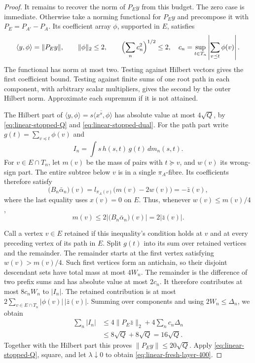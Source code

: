 \begin{proof}
It remains to recover the norm of \(P_Ey\) from this budget. The zero
case is immediate. Otherwise take a norming functional for \(P_Ey\)
and precompose it with \(P_E=P_{A'}-P_A\). Its coefficient array
\(\phi\), supported in \(E\), satisfies
\begin{equation}\label{eq:linear-stopped-dual}
 \langle y,\phi\rangle=\|P_Ey\|,\qquad
 \|\phi\|_2\le2,\qquad
 \Bigl(\sum_nc_n^2\Bigr)^{1/2}\le2,
 \quad c_n=\sup_{t\in T_n}\left|\sum_{v\preceq t}\phi(v)\right|.
\end{equation}
The functional has norm at most two. Testing against Hilbert vectors
gives the first coefficient bound. Testing against finite sums of one
root path in each component, with arbitrary scalar multipliers, gives
the second by the outer Hilbert norm. Approximate each supremum if it
is not attained.

The Hilbert part of
\(\langle y,\phi\rangle=\overline{s\langle x^s,\phi\rangle}\)
has absolute value at most \(4\sqrt Q\), by
\eqref{eq:linear-stopped-Q} and \eqref{eq:linear-stopped-dual}.
For the path part write \(g(t)=\sum_{v\preceq t}\phi(v)\) and
\[
 I_n=\int s\,h(s,t)\,g(t)\,dm_n(s,t).
\]
For \(v\in E\cap T_n\), let \(m(v)\) be the mass of pairs with
\(t\succeq v\), and \(w(v)\) its wrong-sign part. The entire subtree
below \(v\) is in a single \(\pi_A\)-fibre. Its coefficients therefore satisfy
\[
 \bigl(B_n\bar\alpha_n\bigr)(v)
 =l_{\pi_A(v)}\bigl(m(v)-2w(v)\bigr)=-\bar z(v),
\]
where the last equality uses \(x(v)=0\) on \(E\). Thus, whenever
\(w(v)\le m(v)/4\),
\[
 m(v)\le2|\bigl(B_n\bar\alpha_n\bigr)(v)|=2|\bar z(v)|.
\]

Call a vertex \(v\in E\) retained if this inequality's condition holds
at \(v\) and at every preceding vertex of its path in \(E\). Split
\(g(t)\) into its sum over retained vertices and the remainder. The
remainder starts at the first vertex satisfying \(w(v)>m(v)/4\).
Such first vertices form an antichain, so their disjoint descendant
sets have total mass at most \(4W_n\). The remainder is the difference
of two prefix sums and has absolute value at most \(2c_n\). It therefore
contributes at most \(8c_nW_n\) to \(|I_n|\). The retained contribution
is at most
\(2\sum_{v\in E\cap T_n}|\phi(v)|\,|\bar z(v)|\).
Summing over components and using \(2W_n\le\Delta_n\), we obtain
\[
 \begin{split}
 \sum_n|I_n|
 &\le4\|P_E\bar z\|_2+4\sum_nc_n\Delta_n\\
 &\le8\sqrt Q+8\sqrt Q=16\sqrt Q.
 \end{split}
\]
Together with the Hilbert part this proves \(\|P_Ey\|\le20\sqrt Q\).
Apply \eqref{eq:linear-stopped-Q}, square, and let
\(\lambda\downarrow0\) to obtain \eqref{eq:linear-fresh-layer-400}.
\end{proof}

